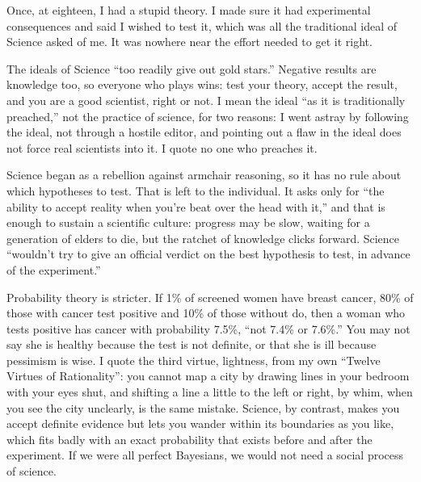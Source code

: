 
Once, at eighteen, I had a stupid theory. I made sure it had experimental consequences and said I wished to test it, which was all the traditional ideal of Science asked of me. It was nowhere near the effort needed to get it right.

The ideals of Science ``too readily give out gold stars.'' Negative results are knowledge too, so everyone who plays wins: test your theory, accept the result, and you are a good scientist, right or not. I mean the ideal ``as it is traditionally preached,'' not the practice of science, for two reasons: I went astray by following the ideal, not through a hostile editor, and pointing out a flaw in the ideal does not force real scientists into it. I quote no one who preaches it. 

Science began as a rebellion against armchair reasoning, so it has no rule about which hypotheses to test. That is left to the individual. It asks only for ``the ability to accept reality when you're beat over the head with it,'' and that is enough to sustain a scientific culture: progress may be slow, waiting for a generation of elders to die, but the ratchet of knowledge clicks forward. Science ``wouldn't try to give an official verdict on the best hypothesis to test, in advance of the experiment.'' 

Probability theory is stricter. If 1\% of screened women have breast cancer, 80\% of those with cancer test positive and 10\% of those without do, then a woman who tests positive has cancer with probability 7.5\%, ``not 7.4\% or 7.6\%.'' You may not say she is healthy because the test is not definite, or that she is ill because pessimism is wise. I quote the third virtue, lightness, from my own ``Twelve Virtues of Rationality'': you cannot map a city by drawing lines in your bedroom with your eyes shut, and shifting a line a little to the left or right, by whim, when you see the city unclearly, is the same mistake. Science, by contrast, makes you accept definite evidence but lets you wander within its boundaries as you like, which fits badly with an exact probability that exists before and after the experiment. If we were all perfect Bayesians, we would not need a social process of science.

